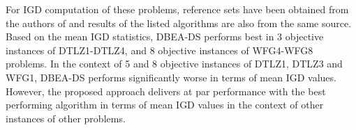 \documentclass[conference]{IEEEtran}
\begin{document}
For IGD computation of these problems, reference sets have been obtained from the authors of \cite{ishibuchi2016inverse} and results of the listed algorithms are also from the same source\cite{ishibuchi2016inverse}. Based on the mean IGD statistics, DBEA-DS performs best in 3 objective instances of DTLZ1-DTLZ4, and 8 objective instances of WFG4-WFG8 problems. In the context of 5 and 8 objective instances of DTLZ1, DTLZ3 and WFG1, DBEA-DS performs significantly worse in terms of mean IGD values. However, the proposed approach delivers at par performance with the best performing algorithm in terms of mean IGD values in the context of other instances of other problems.  

 
\balance 
\small{
}
\end{document}
